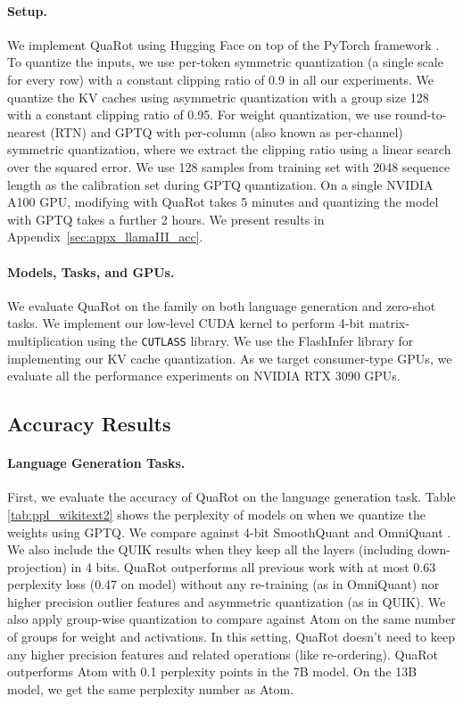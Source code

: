 \vspace{-2mm}
\paragraph{Setup.} We implement QuaRot using Hugging Face \citep{huggingface} on top of the PyTorch framework \citep{pytorch}. To quantize the inputs, we use per-token symmetric quantization (a single scale for every row) with a constant clipping ratio of 0.9 in all our experiments. We quantize the KV caches using asymmetric quantization with a group size 128 with a constant clipping ratio of 0.95. For weight quantization, we use round-to-nearest (RTN) and GPTQ \citep{gptq} with per-column (also known as per-channel) symmetric quantization, where we extract the clipping ratio using a linear search over the squared error. We use 128 samples from \wiki \citep{wikitext} training set with 2048 sequence length as the calibration set during GPTQ quantization. On a single NVIDIA A100 GPU, modifying \llamaBig with QuaRot takes 5 minutes and quantizing the model with GPTQ takes a further 2 hours. We present \llamaIII results in Appendix~\ref{sec:appx_llamaIII_acc}.


\paragraph{Models, Tasks, and GPUs.} We evaluate QuaRot on the \llama family \citep{llama2} on both language generation and zero-shot tasks. We implement our low-level CUDA kernel to perform 4-bit matrix-multiplication using the \texttt{CUTLASS} \citep{nvidia_cutlass} library. We use the FlashInfer \citep{flashinfer} library for implementing our KV cache quantization. As we target consumer-type GPUs, we evaluate all the performance experiments on NVIDIA RTX 3090 GPUs. 


\subsection{Accuracy Results}\label{sec:accuracy_results}
\paragraph{Language Generation Tasks.} First, we evaluate the accuracy of QuaRot on the language generation task. Table \ref{tab:ppl_wikitext2} shows the perplexity of \llama models on \wiki when we quantize the weights using GPTQ.
We compare against 4-bit SmoothQuant \citep{smoothquant} and OmniQuant \citep{omniquant}. We also include the  QUIK \citep{quik} results when they keep all the layers (including down-projection) in 4 bits. QuaRot outperforms all previous work with at most 0.63 perplexity loss (0.47 on \llamaBig model) without any re-training (as in OmniQuant) nor higher precision outlier features and asymmetric quantization (as in QUIK). 
We also apply group-wise quantization to compare against Atom \citep{atom} on the same number of groups for weight and activations. In this setting, QuaRot doesn't need to keep any higher precision features and related operations (like re-ordering). QuaRot outperforms Atom with 0.1 perplexity points in the 7B model. On the 13B model, we get the same perplexity number as Atom.

